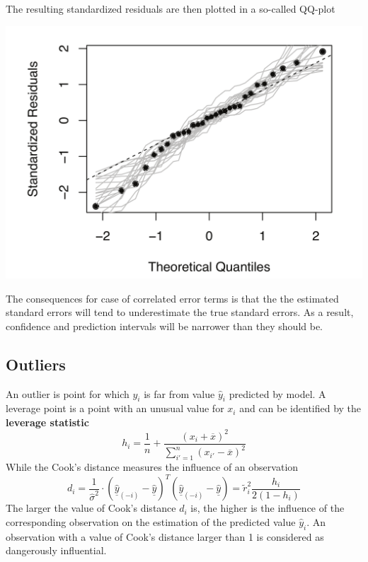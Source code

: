 \documentclass[11pt]{article}
\newcommand*\samplemean[1]{\overline{#1}}
\begin{document}
The resulting standardized residuals are then plotted in a so-called QQ-plot
\begin{center}
	\includegraphics[width=0.5\linewidth]{img/QQ_plot}
\end{center}
\begin{theorem}
	The consequences for case of correlated error terms is that the  the estimated standard errors will tend to underestimate the true standard errors. As a result, confidence and prediction intervals will be narrower than they should be.
\end{theorem}

\subsection{Outliers}
An outlier is point for which $y_i$ is far from value $\hat{y}_i$ predicted by model. A leverage point is a point with an unusual value for $x_i$ and can be identified by the \textbf{leverage statistic}
\begin{equation*}
	h_i = \frac{1}{n} + \frac{(x_i + \samplemean{x})^2}{\sum_{i' = 1}^{n}(x_{i'}-\samplemean{x})^2}
\end{equation*}
While the Cook's distance measures the influence of an observation
\begin{equation*}
	d_i = \frac{1}{\hat{\sigma}^2}\cdot\left(\underline{\hat{y}}_{(-i)} - \underline{\hat{y}}\right)^T \left(\underline{\hat{y}}_{(-i)} - \underline{\hat{y}}\right) = \tilde{r}_i^2 \frac{h_i}{2(1-h_i)}
\end{equation*}
The larger the value of Cook’s distance $d_i$ is, the higher is the influence of the corresponding observation on the estimation of the predicted value $\hat{y}_i$. An observation with a value of Cook’s distance larger than 1 is considered as dangerously influential.
\end{document}
